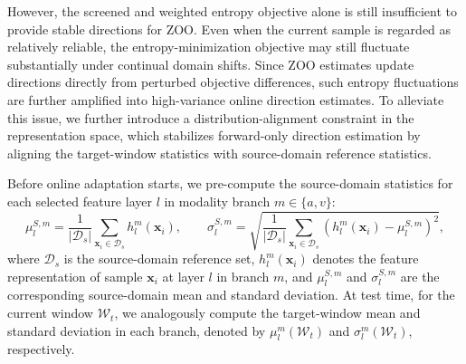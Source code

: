 However, the screened and weighted entropy objective alone is still insufficient to provide stable directions for ZOO.
Even when the current sample is regarded as relatively reliable, the entropy-minimization objective may still fluctuate substantially under continual domain shifts.
Since ZOO estimates update directions directly from perturbed objective differences, such entropy fluctuations are further amplified into high-variance online direction estimates.
To alleviate this issue, we further introduce a distribution-alignment constraint in the representation space, which stabilizes forward-only direction estimation by aligning the target-window statistics with source-domain reference statistics.

Before online adaptation starts, we pre-compute the source-domain statistics for each selected feature layer $l$ in modality branch $m\in\{a,v\}$:
\begin{equation}
\label{eq:source_stats}
\mu_l^{S,m}=\frac{1}{|\mathcal D_s|}\sum_{\mathbf{x}_i\in \mathcal D_s} h_l^{m}(\mathbf{x}_i),
\qquad
\sigma_l^{S,m}=\sqrt{\frac{1}{|\mathcal D_s|}\sum_{\mathbf{x}_i\in \mathcal D_s}\left(h_l^{m}(\mathbf{x}_i)-\mu_l^{S,m}\right)^2},
\end{equation}
where $\mathcal D_s$ is the source-domain reference set, $h_l^{m}(\mathbf{x}_i)$ denotes the feature representation of sample $\mathbf{x}_i$ at layer $l$ in branch $m$, and $\mu_l^{S,m}$ and $\sigma_l^{S,m}$ are the corresponding source-domain mean and standard deviation.
At test time, for the current window $\mathcal W_t$, we analogously compute the target-window mean and standard deviation in each branch, denoted by $\mu_l^{m}(\mathcal W_t)$ and $\sigma_l^{m}(\mathcal W_t)$, respectively.

